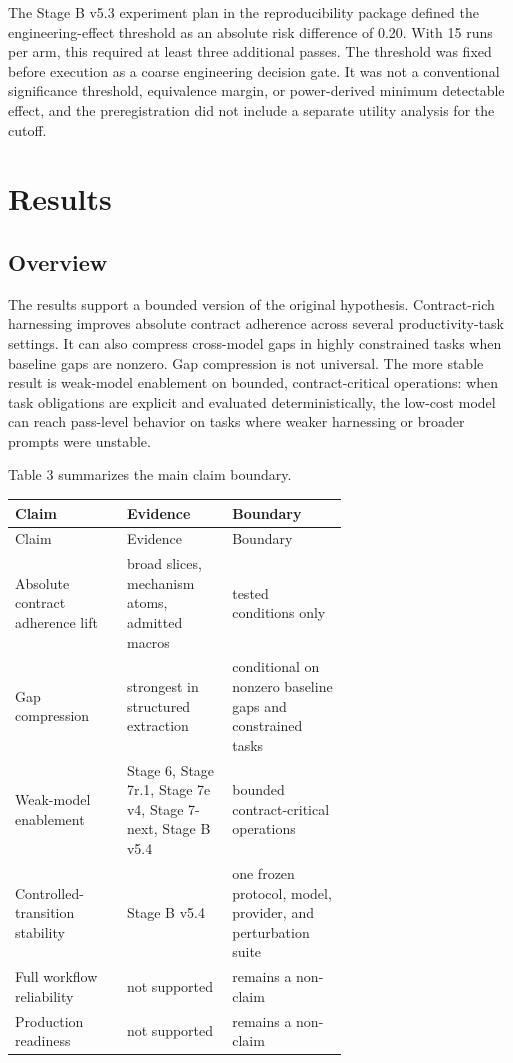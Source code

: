 \documentclass[11pt]{article}
\begin{document}
The Stage B v5.3 experiment plan in the reproducibility package defined the engineering-effect threshold as an absolute risk difference of 0.20. With 15 runs per arm, this required at least three additional passes. The threshold was fixed before execution as a coarse engineering decision gate. It was not a conventional significance threshold, equivalence margin, or power-derived minimum detectable effect, and the preregistration did not include a separate utility analysis for the cutoff.

\section{Results}

\subsection{Overview}

The results support a bounded version of the original hypothesis. Contract-rich harnessing improves absolute contract adherence across several productivity-task settings. It can also compress cross-model gaps in highly constrained tasks when baseline gaps are nonzero. Gap compression is not universal. The more stable result is weak-model enablement on bounded, contract-critical operations: when task obligations are explicit and evaluated deterministically, the low-cost model can reach pass-level behavior on tasks where weaker harnessing or broader prompts were unstable.

Table 3 summarizes the main claim boundary.

{\small
\setlength{\tabcolsep}{3pt}
\begin{longtable}{>{\raggedright\arraybackslash}p{0.220\linewidth}>{\raggedright\arraybackslash}p{0.220\linewidth}>{\raggedright\arraybackslash}p{0.220\linewidth}}
\toprule
Claim & Evidence & Boundary \\
\midrule
\endfirsthead
\toprule
Claim & Evidence & Boundary \\
\midrule
\endhead
Absolute contract adherence lift & broad slices, mechanism atoms, admitted macros & tested conditions only \\
Gap compression & strongest in structured extraction & conditional on nonzero baseline gaps and constrained tasks \\
Weak-model enablement & Stage 6, Stage 7r.1, Stage 7e v4, Stage 7-next, Stage B v5.4 & bounded contract-critical operations \\
Controlled-transition stability & Stage B v5.4 & one frozen protocol, model, provider, and perturbation suite \\
Full workflow reliability & not supported & remains a non-claim \\
Production readiness & not supported & remains a non-claim \\
\bottomrule
\end{longtable}
}
\end{document}
